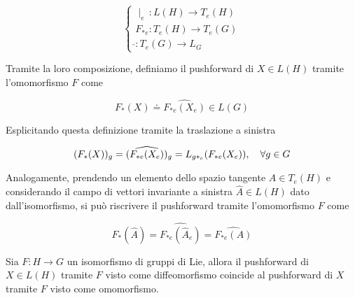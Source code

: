 \begin{equation}
	\begin{cases}
		\mid_{e} \, : L(H) \to T_{e}(H)\\
		F_{*e} : T_{e}(H) \to T_{e}(G)\\
		\hat{} : T_{e}(G) \to L_{G}
	\end{cases}
\end{equation}


Tramite la loro composizione, definiamo il pushforward di $ X \in L(H) $ tramite l'omomorfismo $ F $ come

\begin{equation}
	F_{*}(X) \doteq \widehat{ F_{*e}(X_{e}) } \in L(G)
\end{equation}

Esplicitando questa definizione tramite la traslazione a sinistra

\begin{equation}
	(F_{*}(X))_{g} = (\widehat{ F_{*e}(X_{e}) })_{g} = L_{g*_{e}} (F_{*e}(X_{e})) \qcomma \forall g \in G
\end{equation}

Analogamente, prendendo un elemento dello spazio tangente $ A \in T_{e}(H) $ e considerando il campo di vettori invariante a sinistra $ \hat{A} \in L(H) $ dato dall'isomorfismo, si può riscrivere il pushforward tramite l'omomorfismo $ F $ come

\begin{equation}
	F_{*} (\hat{A}) = \widehat{ F_{*e} (\hat{A}_{e}) } = \widehat{ F_{*e} (A) }
\end{equation}

\begin{definition}[1]
	Sia $ F : H \to G $ un isomorfismo di gruppi di Lie, allora il pushforward di $ X \in L(H) $ tramite $ F $ visto come diffeomorfismo coincide al pushforward di $ X $ tramite $ F $ visto come omomorfismo.
\end{definition}

